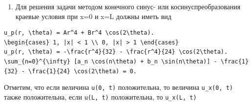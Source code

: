 \documentclass[
  ukrainian,
]{article}
\providecommand{\tightlist}{%
  \setlength{\itemsep}{0pt}\setlength{\parskip}{0pt}}
\begin{document}
\begin{enumerate}
\def\labelenumi{\arabic{enumi}.}
\tightlist
\item
  Для решения задачи методом конечного синус- или косинуспреобразования
  краевые условия при x=0 и x=L должны иметь вид
\end{enumerate}

\begin{verbatim}
u_p(r, \theta) = Ar^4 + Br^4 \cos(2\theta).
\begin{cases} 1, |x| < 1 \\ 0, |x| > 1 \end{cases}
u_p(r, \theta) = -\frac{r^4}{32} - \frac{r^4}{24} \cos(2\theta).
\sum_{n=0}^{\infty} [a_n \cos(n\theta) + b_n \sin(n\theta)] - \frac{1}{32} - \frac{1}{24} \cos(2\theta) = 0.
\end{verbatim}

Отметим, что если величина \texttt{u(0,\ t)} положительна, то величина
\texttt{u\_x(0,\ t)} также положительна, если \texttt{u(L,\ t)}
положительна, то \texttt{u\_x(L,\ t)}
\end{document}

